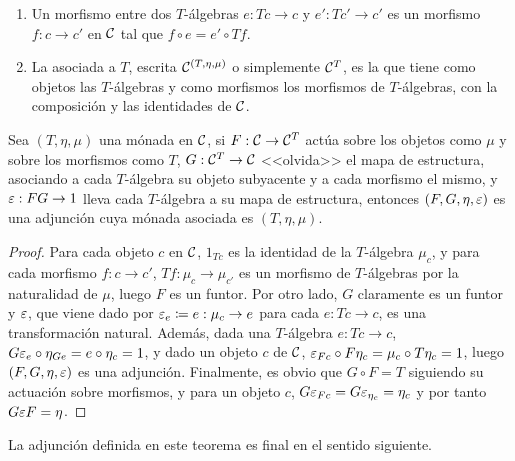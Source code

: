 \begin{definition}
\begin{enumerate}
\begin{figure}
\begin{subfigure}{.45\linewidth}
        \caption{Propiedad unitaria}
      \end{subfigure}
      \caption{Propiedades de las $T$-álgebras.}
      \label{fig:T-algebra}
    \end{figure}
  \item Un morfismo entre dos $T$-álgebras $e:Tc\to c$ y $e':Tc'\to c'$ es un
    morfismo $f:c\to c'$ en $\mathcal{C}$ tal que $f\circ e=e'\circ Tf$.
  \item La  asociada a $T$, escrita
    $\mathcal{C}^{(T,\eta,\mu)}$ o simplemente $\mathcal{C}^T$, es la que tiene como objetos las
    $T$-álgebras y como morfismos los morfismos de $T$-álgebras, con la
    composición y las identidades de $\mathcal{C}$.
  \end{enumerate}
\end{definition}

\begin{theorem}
  Sea $(T,\eta,\mu)$ una mónada en $\mathcal{C}$, si $F:\mathcal{C}\to\mathcal{C}^T$ actúa sobre los
  objetos como $\mu$ y sobre los morfismos como $T$, $G:\mathcal{C}^T\to\mathcal{C}$ <<olvida>>
  el mapa de estructura, asociando a cada $T$-álgebra su objeto subyacente y a
  cada morfismo el mismo, y $\varepsilon:FG\to 1$ lleva cada $T$-álgebra a su mapa de
  estructura, entonces $(F,G,\eta,\varepsilon)$ es una adjunción cuya mónada asociada
  es $(T,\eta,\mu)$.
\end{theorem}
\begin{proof}
  Para cada objeto $c$ en $\mathcal{C}$, $1_{Tc}$ es la identidad de la $T$-álgebra
  $\mu_c$, y para cada morfismo $f:c\to c'$, $Tf:\mu_c\to\mu_{c'}$ es un
  morfismo de $T$-álgebras por la naturalidad de $\mu$, luego $F$ es un
  funtor. Por otro lado, $G$ claramente es un funtor y $\varepsilon$, que viene dado
  por $\varepsilon_e\coloneqq e:\mu_c\to e$ para cada $e:Tc\to c$, es una
  transformación natural. Además, dada una $T$-álgebra $e:Tc\to c$,
  $G\varepsilon_e\circ\eta_{Ge}=e\circ\eta_c=1$, y dado un objeto $c$ de $\mathcal{C}$,
  $\varepsilon_{Fc}\circ F\eta_c=\mu_c\circ T\eta_c=1$, luego $(F,G,\eta,\varepsilon)$ es una
  adjunción. Finalmente, es obvio que $G\circ F=T$ siguiendo su actuación sobre
  morfismos, y para un objeto $c$, $G\varepsilon_{Fc}=G\varepsilon_{\eta_c}=\eta_c$ y por
  tanto $G\varepsilon F=\eta$.
\end{proof}

La adjunción definida en este teorema es final en el sentido siguiente.

